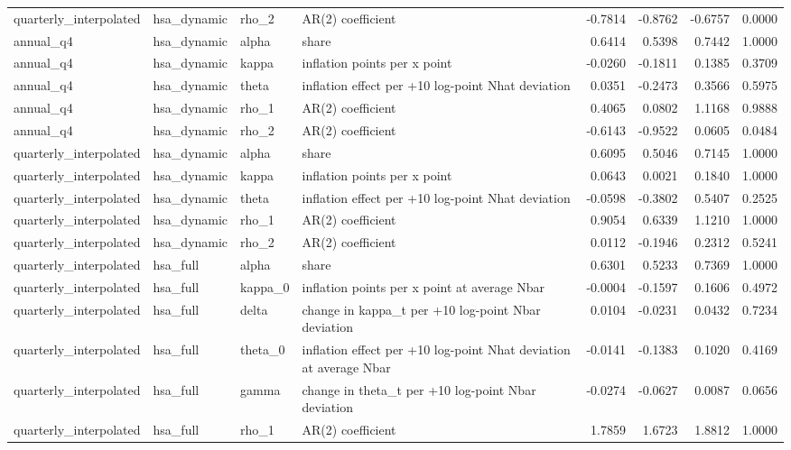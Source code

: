 \begin{tabular}{llllrrrr}
quarterly\_interpolated & hsa\_dynamic & rho\_2 & AR(2) coefficient & -0.7814 & -0.8762 & -0.6757 & 0.0000 \\
annual\_q4 & hsa\_dynamic & alpha & share & 0.6414 & 0.5398 & 0.7442 & 1.0000 \\
annual\_q4 & hsa\_dynamic & kappa & inflation points per x point & -0.0260 & -0.1811 & 0.1385 & 0.3709 \\
annual\_q4 & hsa\_dynamic & theta & inflation effect per +10 log-point Nhat deviation & 0.0351 & -0.2473 & 0.3566 & 0.5975 \\
annual\_q4 & hsa\_dynamic & rho\_1 & AR(2) coefficient & 0.4065 & 0.0802 & 1.1168 & 0.9888 \\
annual\_q4 & hsa\_dynamic & rho\_2 & AR(2) coefficient & -0.6143 & -0.9522 & 0.0605 & 0.0484 \\
quarterly\_interpolated & hsa\_dynamic & alpha & share & 0.6095 & 0.5046 & 0.7145 & 1.0000 \\
quarterly\_interpolated & hsa\_dynamic & kappa & inflation points per x point & 0.0643 & 0.0021 & 0.1840 & 1.0000 \\
quarterly\_interpolated & hsa\_dynamic & theta & inflation effect per +10 log-point Nhat deviation & -0.0598 & -0.3802 & 0.5407 & 0.2525 \\
quarterly\_interpolated & hsa\_dynamic & rho\_1 & AR(2) coefficient & 0.9054 & 0.6339 & 1.1210 & 1.0000 \\
quarterly\_interpolated & hsa\_dynamic & rho\_2 & AR(2) coefficient & 0.0112 & -0.1946 & 0.2312 & 0.5241 \\
quarterly\_interpolated & hsa\_full & alpha & share & 0.6301 & 0.5233 & 0.7369 & 1.0000 \\
quarterly\_interpolated & hsa\_full & kappa\_0 & inflation points per x point at average Nbar & -0.0004 & -0.1597 & 0.1606 & 0.4972 \\
quarterly\_interpolated & hsa\_full & delta & change in kappa\_t per +10 log-point Nbar deviation & 0.0104 & -0.0231 & 0.0432 & 0.7234 \\
quarterly\_interpolated & hsa\_full & theta\_0 & inflation effect per +10 log-point Nhat deviation at average Nbar & -0.0141 & -0.1383 & 0.1020 & 0.4169 \\
quarterly\_interpolated & hsa\_full & gamma & change in theta\_t per +10 log-point Nbar deviation & -0.0274 & -0.0627 & 0.0087 & 0.0656 \\
quarterly\_interpolated & hsa\_full & rho\_1 & AR(2) coefficient & 1.7859 & 1.6723 & 1.8812 & 1.0000 \\

\end{tabular}
